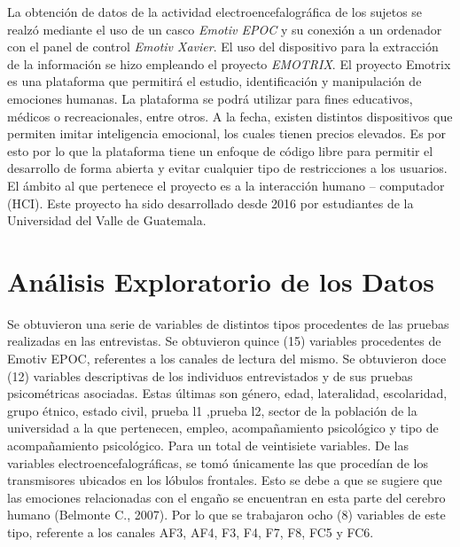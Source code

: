 La obtención de datos de la actividad electroencefalográfica de los sujetos se realzó mediante el uso de un casco \textit{Emotiv EPOC} y su conexión a un ordenador con el panel de control \textit{Emotiv Xavier}. El uso del dispositivo para la extracción de la información se hizo empleando el proyecto \textit{EMOTRIX}. El proyecto Emotrix es una plataforma que permitirá el estudio, identificación y manipulación de emociones humanas. La plataforma se podrá utilizar para fines educativos, médicos o recreacionales, entre otros. A la fecha, existen distintos dispositivos que permiten imitar inteligencia emocional, los cuales tienen precios elevados. Es por esto por lo que la plataforma tiene un enfoque de código libre para permitir el desarrollo de forma abierta y evitar cualquier tipo de restricciones a los usuarios. El ámbito al que pertenece el proyecto es a la interacción humano – computador (HCI). Este proyecto ha sido desarrollado desde 2016 por estudiantes de la Universidad del Valle de Guatemala.

\section{Análisis Exploratorio de los Datos}

Se obtuvieron una serie de variables de distintos tipos procedentes de las pruebas realizadas en las entrevistas. Se obtuvieron quince (15) variables procedentes de Emotiv EPOC, referentes a los canales de lectura del mismo. Se obtuvieron doce (12) variables descriptivas de los individuos entrevistados y de sus pruebas psicométricas asociadas. Estas últimas son género, edad, lateralidad, escolaridad, grupo étnico, estado civil, prueba l1 ,prueba l2, sector de la población de la universidad a la que pertenecen, empleo, acompañamiento psicológico y tipo de acompañamiento psicológico. Para un total de veintisiete variables. De las variables electroencefalográficas, se tomó únicamente las que procedían de los transmisores ubicados en los lóbulos frontales. Esto se debe a que se sugiere que las emociones relacionadas con el engaño se encuentran en esta parte del cerebro humano (Belmonte C., 2007). Por lo que se trabajaron ocho (8) variables de este tipo, referente a los canales AF3, AF4, F3, F4, F7, F8, FC5 y FC6. 

